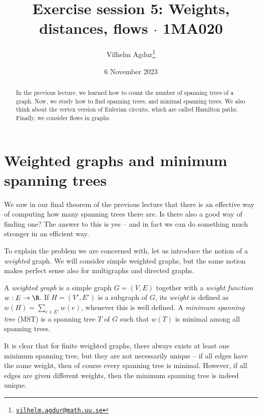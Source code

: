 \documentclass[nobib]{tufte-handout}
\title{Exercise session 5: Weights, distances, flows $\cdot$ 1MA020}
\author[Vilhelm Agdur]{Vilhelm Agdur\thanks{\href{mailto:vilhelm.agdur@math.uu.se}{\nolinkurl{vilhelm.agdur@math.uu.se}}}}
\date{6 November 2023}
\begin{document}
\maketitle%

\begin{abstract}
\noindent
In the previous lecture, we learned how to count the number of spanning trees of a graph. Now, we study how to find spanning trees, and minimal spanning trees. We also think about the vertex version of Eulerian circuits, which are called Hamilton paths. Finally, we consider flows in graphs.
\end{abstract}

\section{Weighted graphs and minimum spanning trees}

We saw in our final theorem of the previous lecture that there is an effective way of computing how many spanning trees there are. Is there also a good way of finding one? The answer to this is yes -- and in fact we can do something much stronger in an efficient way.

To explain the problem we are concerned with, let us introduce the notion of a \emph{weighted} graph. We will consider simple weighted graphs, but the same notion makes perfect sense also for multigraphs and directed graphs.

\begin{definition}
    A \emph{weighted graph} is a simple graph $G = (V,E)$ together with a \emph{weight function} $w: E \to \R$. If $H = (V', E')$ is a subgraph of $G$, its \emph{weight} is defined as $w(H) = \sum_{e\in E'} w(e)$, whenever this is well defined. A \emph{minimum spanning tree} (MST) is a spanning tree $T$ of $G$ such that $w(T)$ is minimal among all spanning trees.
\end{definition}

It is clear that for finite weighted graphs, there always exists at least one minimum spanning tree, but they are not necessarily unique -- if all edges have the same weight, then of course every spanning tree is minimal. However, if all edges are given different weights, then the minimum spanning tree is indeed unique.
\end{document}
